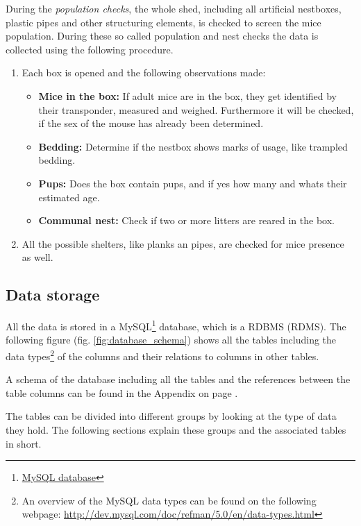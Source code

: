During the \textit{population checks}, the whole shed, including all artificial nestboxes, plastic pipes and other structuring elements, is checked to screen the mice population. During these so called population and nest checks the data is collected using the following procedure.

\begin{enumerate} 
	\item Each box is opened and the following observations made:
	\begin{itemize}
      \item \textbf{Mice in the box:} If adult mice are in the box, they get identified by their transponder, measured and weighed. Furthermore it will be checked, if the sex of the mouse has already been determined.  
      \item \textbf{Bedding:} Determine if the nestbox shows marks of usage, like trampled bedding.
      \item \textbf{Pups:} Does the box contain pups, and if yes how many and whats their estimated age. 
      \item \textbf{Communal nest:} Check if two or more litters are reared in the box. 
    \end{itemize}
	\item All the possible shelters, like planks an pipes, are checked for mice presence as well.
\end{enumerate}

\subsection{Data storage}
\label{subsec:datastorage}

All the data is stored in a MySQL\footnote{\href{http://www.mysql.com/}{MySQL database}} database, which is  a \acf{RDBMS} (RDMS). The following figure (fig. \ref{fig:database_schema}) shows all the tables including the data types\footnote{An overview of the MySQL data types can be found on the following webpage: \url{http://dev.mysql.com/doc/refman/5.0/en/data-types.html}} of the columns and their relations to columns in other tables. 

A schema of the database including all the tables and the references between the table columns can be found in the Appendix on page \pageref{fig:database_schema}.


The tables can be divided into different groups by looking at the type of data they hold. The following sections explain these groups and the associated tables in short.

